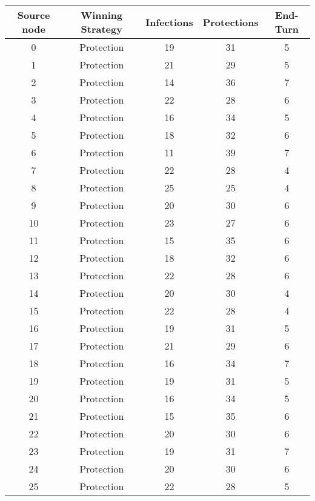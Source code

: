 \documentclass[results.tex]{subfiles}
\begin{document}
\begin{center}
  \begin{tabular}{| c || c | c | c | c |}
    \hline
    {\bfseries Source node} & {\bfseries Winning Strategy} & {\bfseries Infections} & {\bfseries Protections} & {\bfseries End-Turn} \\  %
    \hline\hline
    0 & Protection & 19 & 31 & 5 \\ 
    \hline
    1 & Protection & 21 & 29 & 5 \\ 
    \hline
    2 & Protection & 14 & 36 & 7 \\ 
    \hline
    3 & Protection & 22 & 28 & 6 \\ 
    \hline
    4 & Protection & 16 & 34 & 5 \\ 
    \hline
    5 & Protection & 18 & 32 & 6 \\ 
    \hline
    6 & Protection & 11 & 39 & 7 \\ 
    \hline
    7 & Protection & 22 & 28 & 4 \\ 
    \hline
    8 & Protection & 25 & 25 & 4 \\ 
    \hline
    9 & Protection & 20 & 30 & 6 \\ 
    \hline
    10 & Protection & 23 & 27 & 6 \\ 
    \hline
    11 & Protection & 15 & 35 & 6 \\ 
    \hline
    12 & Protection & 18 & 32 & 6 \\ 
    \hline
    13 & Protection & 22 & 28 & 6 \\ 
    \hline
    14 & Protection & 20 & 30 & 4 \\ 
    \hline
    15 & Protection & 22 & 28 & 4 \\ 
    \hline
    16 & Protection & 19 & 31 & 5 \\ 
    \hline
    17 & Protection & 21 & 29 & 6 \\ 
    \hline
    18 & Protection & 16 & 34 & 7 \\ 
    \hline
    19 & Protection & 19 & 31 & 5 \\ 
    \hline
    20 & Protection & 16 & 34 & 5 \\ 
    \hline
    21 & Protection & 15 & 35 & 6 \\ 
    \hline
    22 & Protection & 20 & 30 & 6 \\ 
    \hline
    23 & Protection & 19 & 31 & 7 \\ 
    \hline
    24 & Protection & 20 & 30 & 6 \\ 
    \hline
    25 & Protection & 22 & 28 & 5 \\ 

\end{tabular}
\end{center}
\end{document}
